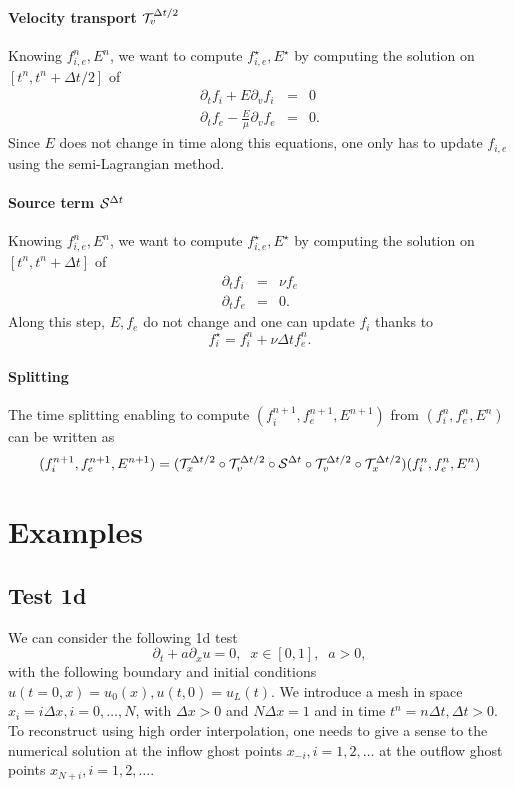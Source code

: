 \documentclass[12pt,english]{article}
\theoremstyle{plain}\newtheorem{theorem}{Theorem}[section]
\theoremstyle{plain}\newtheorem{corollary}{Corollary}[section]
\theoremstyle{plain}\newtheorem{lemma}{Lemma}[section]
\begin{document}
\paragraph{Velocity transport ${\cal T}_v^{\Delta t/2}$}
Knowing $f^n_{i,e}, E^n$, we want to compute $f^\star_{i,e}, E^\star$ by computing the solution on $[t^n, t^n+\Delta t/2]$ of 
\begin{eqnarray*}
\partial_t f_{i} + E\partial_v f_{i} &=& 0\nonumber\\
\partial_t f_{e} -\frac{ E}{\mu}\partial_v f_{e} &=& 0. 
\end{eqnarray*}
Since $E$ does not change in time along this equations, one only has to update $f_{i,e}$ using the semi-Lagrangian method. 

\paragraph{Source term ${\cal S}^{\Delta t}$}
Knowing $f^n_{i,e}, E^n$, we want to compute $f^\star_{i,e}, E^\star$ by computing the solution on $[t^n, t^n+\Delta t]$ of 
\begin{eqnarray*}
\partial_t f_{i} &=& \nu f_e\nonumber\\
\partial_t f_{e} &=& 0. 
\end{eqnarray*}
Along this step, $E, f_e$ do not change and one can update $f_i$ thanks to 
$$
f^{\star}_i = f^n_i + \nu\Delta t f^n_e. 
$$

\paragraph{Splitting}
The time splitting enabling to compute $(f_i^{n+1}, f_e^{n+1}, E^{n+1})$ from $(f_i^{n}, f_e^{n}, E^{n})$ 
can be written as 
$$
(f_i^{n+1}, f_e^{n+1}, E^{n+1}) = ({\cal T}_x^{\Delta t/2} \circ {\cal T}_v^{\Delta t/2}\circ {\cal S}^{\Delta t}\circ {\cal T}_v^{\Delta t/2} \circ  {\cal T}_x^{\Delta t/2} ) (f_i^{n}, f_e^{n}, E^{n})
$$


\section{Examples}
\label{examples}
\subsection{Test 1d}
We can consider the following 1d test 
$$
\partial_t + a \partial_x u = 0, \;\; x\in [0, 1], \;\; a>0, 
$$
with the following boundary and initial conditions $u(t=0, x)=u_0(x), u(t, 0)=u_L(t)$. 
We introduce a mesh in space $x_i=i\Delta x, i=0, \dots, N$, with $\Delta x>0$ and $N\Delta x=1$ 
and in time $t^n=n\Delta t, \Delta t>0$.  
To reconstruct using high order interpolation, one needs to give a sense to the numerical solution at the inflow ghost points  $x_{-i}, i=1, 2, \dots$ at the outflow ghost points $x_{N+i}, i=1, 2, \dots$. 
\end{document}
